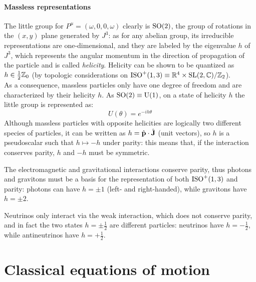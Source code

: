 \paragraph{Massless representations}

The little group for $ P^\mu = (\omega,0,0,\omega) $ clearly is $ \mathrm{SO}(2) $, the group of rotations in the $ (x,y) $ plane generated by $ J^3 $: as for any abelian group, its irreducible representations are one-dimensional, and they are labeled by the eigenvalue $ h $ of $ J^3 $, which represents the angular momentum in the direction of propagation of the particle and is called \textit{helicity}. Helicity can be shown to be quantized as $ h \in \frac{1}{2}\mathbb{Z}_0 $ (by topologic considerations on $ \mathrm{ISO}^+(1,3) \equiv \mathbb{R}^4 \times \mathrm{SL}(2,\mathbb{C}) / \mathbb{Z}_2 $).\\
As a consequence, massless particles only have one degree of freedom and are characterized by their helicity $ h $. As $ \mathrm{SO}(2) \equiv \mathrm{U}(1) $, on a state of helicity $ h $ the little group is represented as:
\begin{equation}
  U(\theta) = e^{-i h \theta}
  \label{eq:1.55}
\end{equation}
Although massless particles with opposite helicities are logically two different species of particles, it can be written as $ h = \hat{\mathbf{p}} \cdot \hat{\mathbf{J}} $ (unit vectors), so $ h $ is a pseudoscalar such that $ h \mapsto -h $ under parity: this means that, if the interaction conserves parity, $ h $ and $ -h $ must be symmetric.

\begin{example}{}{}
  The electromagnetic and gravitational interactions conserve parity, thus photons and gravitons must be a basis for the representation of both $ \mathrm{ISO}^+(1,3) $ and parity: photons can have $ h = \pm 1 $ (left- and right-handed), while gravitons have $ h = \pm 2 $.
\end{example}

\begin{example}{}{}
  Neutrinos only interact via the weak interaction, which does not conserve parity, and in fact the two states $ h = \pm \frac{1}{2} $ are different particles: neutrinos have $ h = - \frac{1}{2} $, while antineutrinos have $ h = + \frac{1}{2} $.
\end{example}

\section{Classical equations of motion}

